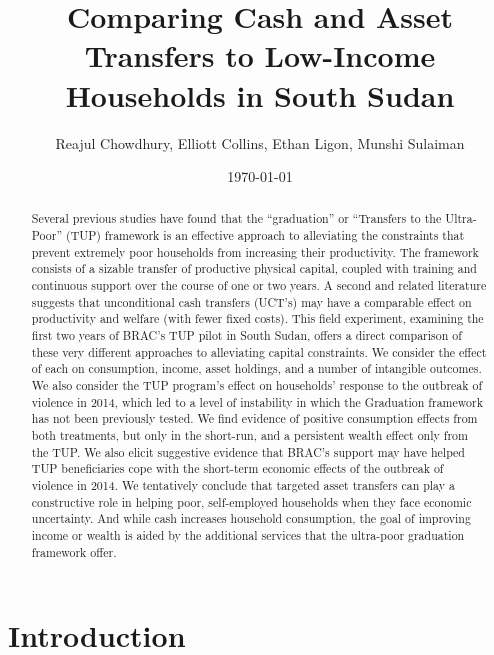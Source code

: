 \documentclass[12pt,article]{article}
\author{Reajul Chowdhury, Elliott Collins, Ethan Ligon, Munshi Sulaiman}
\date{\today}
\title{Comparing Cash and Asset Transfers to Low-Income Households in South Sudan}
\begin{document}
\maketitle
\begin{abstract}


Several previous studies have found that the ``graduation'' or ``Transfers to the
Ultra-Poor'' (TUP) framework is an effective approach to alleviating the constraints
that prevent extremely poor households from increasing their productivity. The
framework consists of a sizable transfer of productive physical capital, coupled with
training and continuous support over the course of one or two years. A second and
related literature suggests that unconditional cash transfers (UCT's) may have a
comparable effect on productivity and welfare (with fewer fixed costs). This field
experiment, examining the first two years of BRAC's TUP pilot in South Sudan, offers
a direct comparison of these very different approaches to alleviating capital
constraints. We consider the effect of each on consumption, income, asset holdings,
and a number of intangible outcomes. We also consider the TUP program's effect on
households' response to the outbreak of violence in 2014, which led to a level of
instability in which the Graduation framework has not been previously tested. We find
evidence of positive consumption effects from both treatments, but only in the
short-run, and a persistent wealth effect only from the TUP. We also elicit
suggestive evidence that BRAC's support may have helped TUP beneficiaries cope with
the short-term economic effects of the outbreak of violence in 2014. We tentatively
conclude that targeted asset transfers can play a constructive role in helping poor,
self-employed households when they face economic uncertainty. And while cash
increases household consumption, the goal of improving income or wealth is aided by
the additional services that the ultra-poor graduation framework offer.
\end{abstract}
\newpage

\section*{Introduction}
\label{sec-1}
\end{document}

